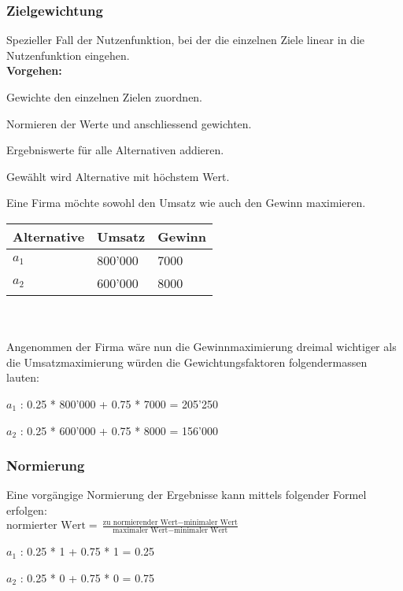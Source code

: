 \subsubsection{Zielgewichtung}
Spezieller Fall der Nutzenfunktion, bei der die einzelnen Ziele linear in die Nutzenfunktion eingehen.\\
\textbf{Vorgehen:} 
\begin{compactenum}
	\item Gewichte den einzelnen Zielen zuordnen.
	\item Normieren der Werte und anschliessend gewichten.
	\item Ergebniswerte für alle Alternativen addieren.
	\item Gewählt wird Alternative mit höchstem Wert.
\end{compactenum}
\begin{example}
	Eine Firma möchte sowohl den Umsatz	wie auch den Gewinn maximieren. \\
	\begin{tabular}{|l|l|l|}
		\hline
		\textbf{Alternative} & \textbf{Umsatz} & \textbf{Gewinn} \\ \hline
		$a_1$ & 800'000 & 7000 \\ \hline
		$a_2$ & 600'000 & 8000 \\ \hline		
	\end{tabular} \\ \ \\
	Angenommen der Firma wäre nun die Gewinnmaximierung dreimal wichtiger als die Umsatzmaximierung würden die Gewichtungsfaktoren folgendermassen lauten: 
	\begin{compactitem}
		\item $a_1$ : 0.25 * 800'000 + 0.75 * 7000 = 205'250
		\item $a_2$ : 0.25 * 600'000 + 0.75 * 8000 = 156'000
	\end{compactitem}
\end{example}

\subsubsection{Normierung}
Eine vorgängige Normierung der Ergebnisse kann mittels folgender Formel erfolgen: \\
$\text{normierter Wert} = \frac{\text{zu normierender Wert} - \text{minimaler Wert}}{\text{maximaler Wert} - \text{minimaler Wert}}$
\begin{example}
	\begin{compactitem}
		\item $a_1$ : 0.25 * 1 + 0.75 * 1 = 0.25
		\item $a_2$ : 0.25 * 0 + 0.75 * 0 = 0.75
	\end{compactitem}
\end{example}

